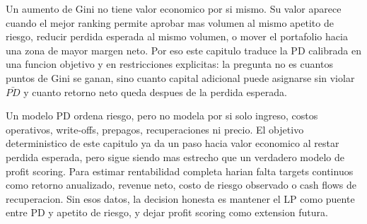 \documentclass[
  spanish,
  11pt,
  letterpaper,
]{scrbook}
\theoremstyle{plain}
\theoremstyle{remark}
\begin{document}
\begin{tcolorbox}[enhanced jigsaw, arc=.35mm, bottomrule=.15mm, bottomtitle=1mm, breakable, colback=white, colbacktitle=quarto-callout-note-color!10!white, colframe=quarto-callout-note-color-frame, coltitle=black, left=2mm, leftrule=.75mm, opacityback=0, opacitybacktitle=0.6, rightrule=.15mm, title=\textcolor{quarto-callout-note-color}{\faInfo}\hspace{0.5em}{El Gini solo vale cuando cambia una decision}, titlerule=0mm, toprule=.15mm, toptitle=1mm]

Un aumento de Gini no tiene valor economico por si mismo. Su valor
aparece cuando el mejor ranking permite aprobar mas volumen al mismo
apetito de riesgo, reducir perdida esperada al mismo volumen, o mover el
portafolio hacia una zona de mayor margen neto. Por eso este capitulo
traduce la PD calibrada en una funcion objetivo y en restricciones
explicitas: la pregunta no es cuantos puntos de Gini se ganan, sino
cuanto capital adicional puede asignarse sin violar \(\bar{PD}\) y
cuanto retorno neto queda despues de la perdida esperada.

\end{tcolorbox}

\begin{tcolorbox}[enhanced jigsaw, arc=.35mm, bottomrule=.15mm, bottomtitle=1mm, breakable, colback=white, colbacktitle=quarto-callout-tip-color!10!white, colframe=quarto-callout-tip-color-frame, coltitle=black, left=2mm, leftrule=.75mm, opacityback=0, opacitybacktitle=0.6, rightrule=.15mm, title=\textcolor{quarto-callout-tip-color}{\faLightbulb}\hspace{0.5em}{PD no es rentabilidad}, titlerule=0mm, toprule=.15mm, toptitle=1mm]

Un modelo PD ordena riesgo, pero no modela por si solo ingreso, costos
operativos, write-offs, prepagos, recuperaciones ni precio. El objetivo
deterministico de este capitulo ya da un paso hacia valor economico al
restar perdida esperada, pero sigue siendo mas estrecho que un verdadero
modelo de profit scoring. Para estimar rentabilidad completa harian
falta targets continuos como retorno anualizado, revenue neto, costo de
riesgo observado o cash flows de recuperacion. Sin esos datos, la
decision honesta es mantener el LP como puente entre PD y apetito de
riesgo, y dejar profit scoring como extension futura.

\end{tcolorbox}
\end{document}
